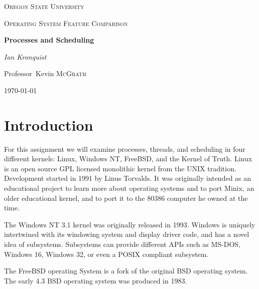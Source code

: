 \documentclass[10pt,conference,draftclsnofoot,onecolumn]{IEEEtran}
\begin{document}
\begin{titlepage}
    \centering
    {\scshape\LARGE Oregon State University \par}
    \vspace{1cm}
    {\scshape\Large Operating System Feature Comparison \par}
    \vspace{1.5cm}
    {\huge\bfseries Processes and Scheduling \par}
    \vspace{2cm}
    {\Large\itshape Ian Kronquist \par}
    \vfill
    \par
    Professor~Kevin \textsc{McGrath}

    \vfill

    {\large \today\par}
\end{titlepage}


\author{
}

\bigskip

\section{Introduction}
For this assignment we will examine processes, threads, and scheduling in four different kernels: Linux, Windows NT, FreeBSD, and the Kernel of Truth.
Linux is an open source GPL licensed monolithic kernel from the UNIX tradition. Development started in 1991 by Linus Torvalds. It was originally intended as an educational project to learn more about operating systems and to port Minix, an older educational kernel, and to port it to the 80386 computer he owned at the time\cite{1_love_2010}.

The Windows NT 3.1 kernel was originally released in 1993. Windows is uniquely intertwined with its windowing system and display driver code, and has a novel idea of subsystems. Subsystems can provide different APIs such as MS-DOS, Windows 16, Windows 32, or even a POSIX compliant subsystem\cite{2_russinovich_solomon_ionescu_2012}.

The FreeBSD operating System is a fork of the original BSD operating system. The early 4.3 BSD operating system was produced in 1983\cite{3_mckusick_neville-neil_watson_2015}.
\end{document}
